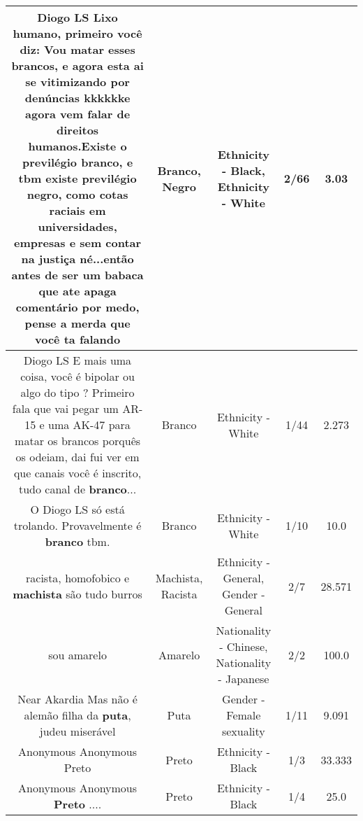 \documentclass[11pt]{article}
\newlength\mylength
\begin{document}
\begin{center}
\begin{longtable}{|C{.65\mylength}|C{.30\mylength}|C{.12\mylength}|C{.12\mylength}|C{.12\mylength}|}
  \small Diogo LS Lixo humano, primeiro você diz: Vou matar esses brancos, e agora esta ai se vitimizando por denúncias kkkkkke agora vem falar de direitos humanos.Existe o previlégio \textbf{branco}, e tbm existe previlégio \textbf{negro}, como cotas raciais em universidades, empresas e sem contar na justiça né...então antes de ser um babaca que ate apaga comentário por medo, pense a merda que você ta falando\normalsize   & Branco, Negro & Ethnicity - Black, Ethnicity - White & 2/66 & 3.03 \\  \hline
  \small Diogo LS E mais uma coisa, você é bipolar ou algo do tipo ? Primeiro fala que vai pegar um AR-15 e uma AK-47 para matar os brancos porquês os odeiam, dai fui ver em que canais você é inscrito, tudo canal de \textbf{branco}...\normalsize   & Branco & Ethnicity - White & 1/44 & 2.273 \\  \hline
  \small O Diogo LS só está trolando. Provavelmente é \textbf{branco} tbm.\normalsize   & Branco & Ethnicity - White & 1/10 & 10.0 \\  \hline
  \small racista, homofobico e \textbf{machista} são tudo burros\normalsize   & Machista, Racista & Ethnicity - General, Gender - General & 2/7 & 28.571 \\  \hline
  \small sou amarelo\normalsize   & Amarelo & Nationality - Chinese, Nationality - Japanese & 2/2 & 100.0 \\  \hline
  \small Near Akardia Mas não é alemão filha da \textbf{puta}, judeu miserável\normalsize   & Puta & Gender - Female sexuality & 1/11 & 9.091 \\  \hline
  \small Anonymous Anonymous Preto\normalsize   & Preto & Ethnicity - Black & 1/3 & 33.333 \\  \hline
  \small Anonymous Anonymous \textbf{Preto} ....\normalsize   & Preto & Ethnicity - Black & 1/4 & 25.0 \\  \hline

\end{longtable}
\end{center}
\end{document}

